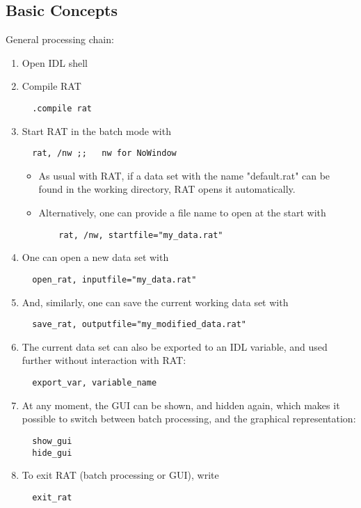 \subsection{Basic Concepts}
General processing chain:
\begin{enumerate}
  \item Open IDL shell
  \item Compile RAT
\begin{verbatim}
  .compile rat
\end{verbatim}
  \item Start RAT in the batch mode with
\begin{verbatim}
  rat, /nw ;;   nw for NoWindow
\end{verbatim}
  \begin{itemize}
    \item As usual with RAT, if a data set with the name "default.rat" can be
    found in the working directory, RAT opens it automatically.
    \item Alternatively, one can provide a file name to open at the start with
\begin{verbatim}
    rat, /nw, startfile="my_data.rat"
\end{verbatim}
  \end{itemize}
  \item One can open a new data set with
\begin{verbatim}
  open_rat, inputfile="my_data.rat"
\end{verbatim}
  \item And, similarly, one can save the current working data
  set with
\begin{verbatim}
  save_rat, outputfile="my_modified_data.rat"
\end{verbatim}
  \item The current data set can
  also be exported to an IDL variable, and used further without interaction with
  RAT: 
\begin{verbatim}
  export_var, variable_name
\end{verbatim}
  \item At any moment, the GUI can be shown, and hidden
  again, which makes it possible to switch between batch processing, and the
  graphical representation: 
\begin{verbatim}
  show_gui
  hide_gui
\end{verbatim}
  \item To exit RAT (batch processing or
  GUI), write
\begin{verbatim}
  exit_rat
\end{verbatim}
\end{enumerate}

